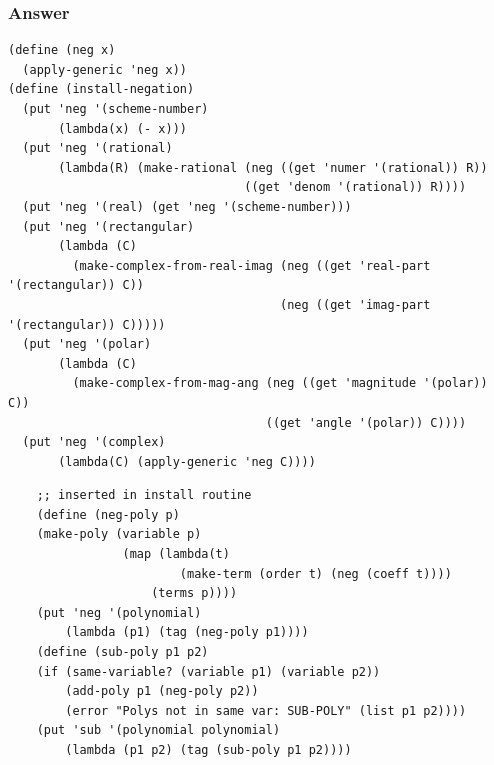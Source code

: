 \documentclass[final,fleqn,titlepage,twoside]{article}
\begin{document}
\subsubsection{Answer}
\label{sec:org02f067e}
\begin{verbatim}
(define (neg x)
  (apply-generic 'neg x))
(define (install-negation)
  (put 'neg '(scheme-number)
       (lambda(x) (- x)))
  (put 'neg '(rational)
       (lambda(R) (make-rational (neg ((get 'numer '(rational)) R))
                                 ((get 'denom '(rational)) R))))
  (put 'neg '(real) (get 'neg '(scheme-number)))
  (put 'neg '(rectangular)
       (lambda (C)
         (make-complex-from-real-imag (neg ((get 'real-part '(rectangular)) C))
                                      (neg ((get 'imag-part '(rectangular)) C)))))
  (put 'neg '(polar)
       (lambda (C)
         (make-complex-from-mag-ang (neg ((get 'magnitude '(polar)) C))
                                    ((get 'angle '(polar)) C))))
  (put 'neg '(complex)
       (lambda(C) (apply-generic 'neg C))))
\end{verbatim}
\begin{verbatim}
    ;; inserted in install routine
    (define (neg-poly p)
    (make-poly (variable p)
                (map (lambda(t)
                        (make-term (order t) (neg (coeff t))))
                    (terms p))))
    (put 'neg '(polynomial)
        (lambda (p1) (tag (neg-poly p1))))
    (define (sub-poly p1 p2)
    (if (same-variable? (variable p1) (variable p2))
        (add-poly p1 (neg-poly p2))
        (error "Polys not in same var: SUB-POLY" (list p1 p2))))
    (put 'sub '(polynomial polynomial)
        (lambda (p1 p2) (tag (sub-poly p1 p2))))
\end{verbatim}
\end{document}
